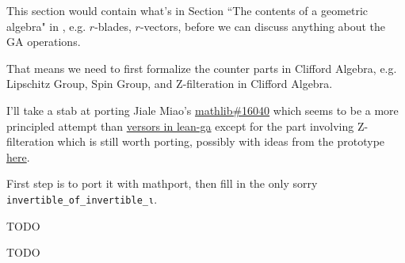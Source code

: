 This section would contain what's in Section ``The contents of a geometric algebra" in \cite{chisolm2012geometric}, e.g. $r$-blades, $r$-vectors, before we can discuss anything about the GA operations.

That means we need to first formalize the counter parts in Clifford Algebra, e.g. Lipschitz Group, Spin Group, and Z-filteration in Clifford Algebra.

I'll take a stab at porting Jiale Miao's \href{https://github.com/leanprover-community/mathlib/pull/16040}{mathlib\#16040} which seems to be a more principled attempt than \href{https://github.com/pygae/lean-ga/blob/master/src/geometric_algebra/from_mathlib/versors.lean}{versors in lean-ga} except for the part involving Z-filteration which is still worth porting, possibly with ideas from the prototype \href{https://github.com/eric-wieser/lftcm2023-clifford_algebra/}{here}.

First step is to port it with mathport, then fill in the only sorry \lstinline|invertible_of_invertible_ι|.

\begin{definition}
    \label{Lipschitz}
    \tangled

    TODO

\end{definition}

\begin{definition}
    \label{SpinGroup}
    \tangled

    TODO

\end{definition}